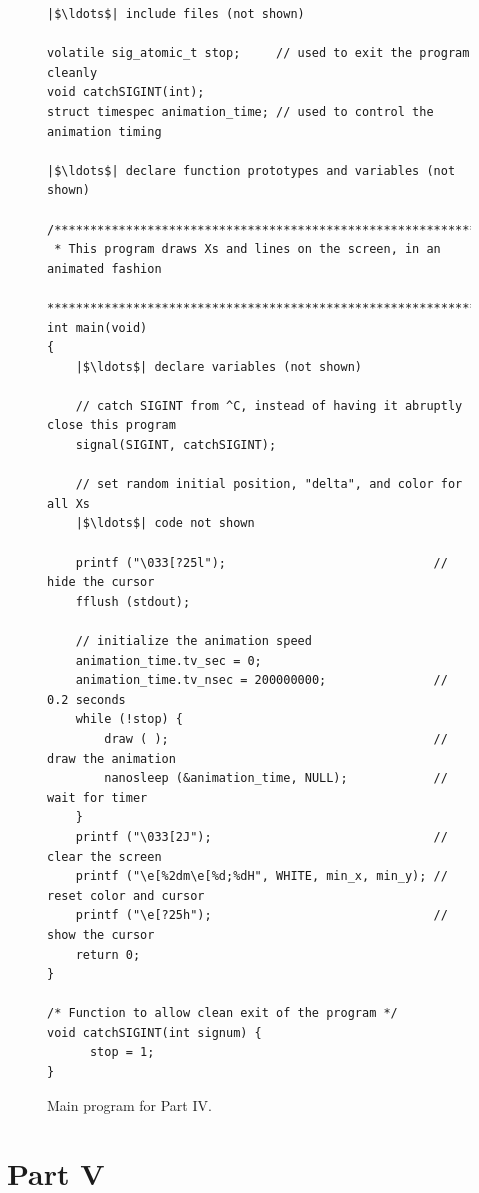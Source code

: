 \documentclass[epsfig,10pt,fullpage]{article}
\begin{document}
\lstset{language=C,numbers=none,escapechar=|}
\begin{figure}[!h]
\begin{center}
\begin{minipage}[t]{15.5 cm}
\begin{lstlisting}[name=main]
|$\ldots$| include files (not shown)

volatile sig_atomic_t stop;     // used to exit the program cleanly
void catchSIGINT(int);
struct timespec animation_time; // used to control the animation timing

|$\ldots$| declare function prototypes and variables (not shown)

/*******************************************************************************
 * This program draws Xs and lines on the screen, in an animated fashion
 ******************************************************************************/
int main(void)
{
    |$\ldots$| declare variables (not shown)

    // catch SIGINT from ^C, instead of having it abruptly close this program
    signal(SIGINT, catchSIGINT);

    // set random initial position, "delta", and color for all Xs
    |$\ldots$| code not shown

    printf ("\033[?25l");                             // hide the cursor
    fflush (stdout);

    // initialize the animation speed
    animation_time.tv_sec = 0;
    animation_time.tv_nsec = 200000000;               // 0.2 seconds
    while (!stop) {
        draw ( );                                     // draw the animation
        nanosleep (&animation_time, NULL);            // wait for timer
    }
    printf ("\033[2J");                               // clear the screen
    printf ("\e[%2dm\e[%d;%dH", WHITE, min_x, min_y); // reset color and cursor
    printf ("\e[?25h");                               // show the cursor
    return 0;
}

/* Function to allow clean exit of the program */
void catchSIGINT(int signum) {
      stop = 1;
}
\end{lstlisting}
\end{minipage}
\caption{Main program for Part IV.}
\label{fig:main}
\end{center}
\end{figure}

\noindent
\section*{Part V}
\end{document}
